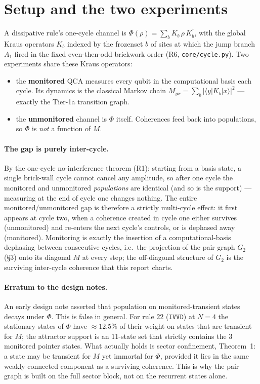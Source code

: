 \documentclass[11pt]{article}
\newcommand{\rt}[1]{\texttt{#1}}
\newcommand{\fn}[1]{\texttt{#1}}
\providecommand{\ket}[1]{|#1\rangle}
\providecommand{\bra}[1]{\langle #1|}
\newcommand{\GG}{G_2}
\theoremstyle{plain}
\theoremstyle{definition}
\begin{document}
\section{Setup and the two experiments}
A dissipative rule's one-cycle channel is
$\Phi(\rho)=\sum_b K_b\,\rho\,K_b^\dagger$, with the global Kraus operators $K_b$
indexed by the frozenset $b$ of sites at which the jump branch $A_1$ fired in the
fixed even-then-odd brickwork order (R6, \fn{core/cycle.py}). Two experiments
share these Kraus operators:
\begin{itemize}
  \item the \textbf{monitored} QCA measures every qubit in the computational
  basis each cycle. Its dynamics is the classical Markov chain
  $M_{yx}=\sum_b|\bra{y}K_b\ket{x}|^2$ --- exactly the Tier-1a transition graph.
  \item the \textbf{unmonitored} channel is $\Phi$ itself. Coherences feed back
  into populations, so $\Phi$ is \emph{not} a function of $M$.
\end{itemize}

\paragraph{The gap is purely inter-cycle.} By the one-cycle no-interference
theorem (R1): starting from a basis state, a single brick-wall cycle cannot
cancel any amplitude, so after one cycle the monitored and unmonitored
\emph{populations} are identical (and so is the support) --- measuring at the end
of cycle one changes nothing. The entire monitored/unmonitored gap is therefore a
strictly multi-cycle effect: it first appears at cycle two, when a coherence
created in cycle one either survives (unmonitored) and re-enters the next cycle's
controls, or is dephased away (monitored). Monitoring is exactly the insertion of
a computational-basis dephasing between consecutive cycles, i.e.\ the projection
of the pair graph $\GG$ (\S3) onto its diagonal $M$ at every step; the off-diagonal
structure of $\GG$ is the surviving inter-cycle coherence that this report
charts.

\paragraph{Erratum to the design notes.} An early design note asserted that
population on monitored-transient states decays under $\Phi$. This is false in
general. For rule $22$ ($\rt{IVVD}$) at $N=4$ the stationary states of $\Phi$
have $\approx 12.5\%$ of their weight on states that are transient for $M$; the
attractor support is an $11$-state set that strictly contains the $3$ monitored
pointer states. What actually holds is sector confinement, Theorem~1: a state may
be transient for $M$ yet immortal for $\Phi$, provided it lies in the same
weakly connected component as a surviving coherence. This is why the pair graph
is built on the full sector block, not on the recurrent states alone.
\end{document}
